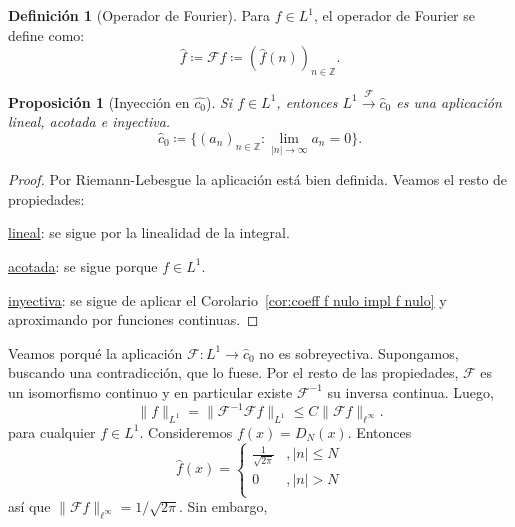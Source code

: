 \documentclass{article}
\newtheorem{Proposicion}{Proposición}
\theoremstyle{plain}
\theoremstyle{definition}
\newtheorem{Definicion}{Definición}
\newcommand{\Z}{\mathbb{Z}}
\newcommand{\F}{\mathcal{F}}
\newcommand{\abs}[1]{\lvert #1 \rvert}
\newcommand{\norm}[1]{\lVert #1 \rVert}
\newcommand{\normL}[2]{\lVert #2 \rVert_{L^#1}}
\begin{document}
\begin{Definicion}[Operador de Fourier]
  Para \(f\in L^1\), el operador de Fourier se define como:
  \begin{displaymath}
    \hat f \coloneqq \F f \coloneqq (\hat f(n))_{n\in \Z}. 
  \end{displaymath}
\end{Definicion}

\begin{Proposicion}[Inyección en \(\hat{c_0}\)]
  Si \(f\in L^1\), entonces \(L^1 \xrightarrow{\F} \hat{c}_0\) es una aplicación lineal, acotada
  e inyectiva.
  \begin{displaymath}
    \hat c_0 \coloneqq \lbrace (a_n)_{n\in\Z}\colon \lim_{\abs{n} \to \infty} a_n = 0 \rbrace.
  \end{displaymath}
\end{Proposicion}
\begin{proof}
  Por Riemann{-}Lebesgue la aplicación está bien definida. Veamos el resto de propiedades:
  
  \underline{lineal}: se sigue por la linealidad de la integral.

  \underline{acotada}: se sigue porque \(f\in L^1\). 

  \underline{inyectiva}: se sigue de aplicar el Corolario~\ref{cor:coeff f nulo impl f nulo} y aproximando
  por funciones continuas.
\end{proof}

Veamos porqué la aplicación \(\F \colon L^1 \to \hat c_0\) no es sobreyectiva. Supongamos, buscando
una contradicción, que lo fuese. Por el resto de las propiedades, \(\F\) es un isomorfismo continuo
y en particular existe \(\F^{-1}\) su inversa continua. Luego,
\begin{displaymath}
  \normL{1}{f} = \normL{1}{\F^{-1} \F f} \le C \norm{\F f}_{\ell^{\infty}}. 
\end{displaymath}
para cualquier \(f\in L^1\). Consideremos \(f(x) = D_N(x)\). Entonces
\begin{displaymath}
  \hat f(x) = \begin{cases}
    \frac{1}{\sqrt{2\pi}} &, \abs{n} \le N\\
    0 &, \abs{n} > N\\
  \end{cases}
\end{displaymath}
así que \(\norm{\F f}_{\ell^{\infty}} = 1/\sqrt{2\pi}\). Sin embargo,
\end{document}
